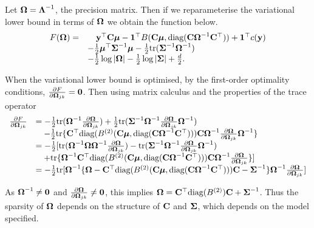Let ${\boldsymbol \Omega} = {\boldsymbol \Lambda}^{-1}$, the precision matrix. Then if we reparameterise
the variational lower bound in terms of ${\boldsymbol \Omega}$ we obtain the function below.
\begin{equation}
\label{eq:gva_lower_bound_precision_param_omega}
\begin{array}{ll}
F({\boldsymbol \Omega}) =& \quad {\bf y}^\top {\bf C} {\boldsymbol\mu} - {\bf 1}^\top B({\bf C} {\boldsymbol \mu}, \text{diag}({\bf C} {\boldsymbol \Omega}^{-1} {\bf C}^\top)) + {\bf 1}^\top c({\bf y}) \\
&- \tfrac{1}{2} {\boldsymbol \mu}^\top {\boldsymbol\Sigma}^{-1} {\boldsymbol \mu} - \tfrac{1}{2} \text{tr}({\boldsymbol \Sigma}^{-1} {\boldsymbol \Omega}^{-1}) \\
&- \tfrac{1}{2} \log |{\boldsymbol \Omega}| - \tfrac{1}{2} \log |{\boldsymbol \Sigma}| + \tfrac{d}{2}.
\end{array}
\end{equation}

When the variational lower bound is optimised, by the first-order optimality
conditions, $\tfrac{\partial F}{\partial {\boldsymbol\Omega}_{jk}} = {\bf 0}$. Then using
matrix calculus and the properties of the trace operator
\begin{equation*}
\begin{array}{ll}
\tfrac{\partial F}{\partial {\boldsymbol\Omega}_{jk}} &= -\tfrac{1}{2} \text{tr}({\boldsymbol \Omega}^{-1} \tfrac{\partial {\boldsymbol\Omega}}{\partial {\boldsymbol\Omega}_{jk}}) + \tfrac{1}{2} \text{tr}({\boldsymbol \Sigma}^{-1} {\boldsymbol \Omega}^{-1} \tfrac{\partial {\boldsymbol\Omega}}{\partial {\boldsymbol\Omega}_{jk}} {\boldsymbol \Omega}^{-1}) \\
&\quad -\tfrac{1}{2} \text{tr}\{{\bf C}^\top \text{diag}(B^{(2)}({\bf C} {\boldsymbol \mu}, \text{diag}({\bf C} {\boldsymbol \Omega}^{-1} {\bf C}^\top))) {\bf C} {\boldsymbol \Omega}^{-1} \tfrac{\partial {\boldsymbol\Omega}}{\partial {\boldsymbol\Omega}_{jk}} {\boldsymbol \Omega}^{-1}\} \\
&=-\tfrac{1}{2} [ \text{tr}({\boldsymbol \Omega}^{-1} {\boldsymbol \Omega} {\boldsymbol \Omega}^{-1} \tfrac{\partial {\boldsymbol\Omega}}{\partial {\boldsymbol\Omega}_{jk}}) - \text{tr}({\boldsymbol \Sigma}^{-1} {\boldsymbol \Omega}^{-1} \tfrac{\partial {\boldsymbol\Omega}}{\partial {\boldsymbol\Omega}_{jk}} {\boldsymbol \Omega}^{-1}) \\
&\quad + \text{tr}\{{\boldsymbol \Omega}^{-1} {\bf C}^\top \text{diag}(B^{(2)}({\bf C} {\boldsymbol \mu}, \text{diag}({\bf C} {\boldsymbol \Omega}^{-1} {\bf C}^\top))) {\bf C} {\boldsymbol \Omega}^{-1} \tfrac{\partial {\boldsymbol\Omega}}{\partial {\boldsymbol\Omega}_{jk}}\} ] \\
&= -\tfrac{1}{2} \text{tr}[{\boldsymbol \Omega}^{-1}\{ {\boldsymbol \Omega} - {\bf C}^\top \text{diag}(B^{(2)}({\bf C} {\boldsymbol \mu}, \text{diag}({\bf C} {\boldsymbol \Omega}^{-1} {\bf C}^\top))) {\bf C} - {\boldsymbol \Sigma}^{-1} \} {\boldsymbol \Omega}^{-1} \tfrac{\partial {\boldsymbol\Omega}}{\partial {\boldsymbol\Omega}_{jk}}]
\end{array}
\end{equation*}

As ${\boldsymbol \Omega}^{-1} \ne {\bf0}$ and $\tfrac{\partial {\boldsymbol\Omega}}{\partial
{\boldsymbol\Omega}_{jk}} \ne {\bf0}$, this implies ${\boldsymbol \Omega} = {\bf C}^\top
\text{diag}(B^{(2)}) {\bf C} + {\boldsymbol \Sigma}^{-1}$. Thus the sparsity of ${\boldsymbol \Omega}$
depends on the structure of ${\bf C}$ and ${\boldsymbol \Sigma}$, which depends on the model
specified.

